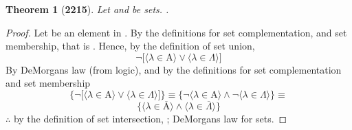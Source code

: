 \documentclass[preview]{standalone}
\newtheorem{theorem}{Theorem}
\begin{document}
\begin{theorem}[\textbf{2215}]
    Let  and \bm{$\Lambda$} be sets. 
    .
\end{theorem}
\begin{proof}
    Let \bm{$\lambda$} be an element in . 
    By the definitions for set complementation, and set membership, that is 
    . 
    Hence, by the definition of set union, 
    \begin{equation*}
        \lnot \bigg[
            \Big \langle \lambda \in \mathrm{A} \Big \rangle 
                \lor 
            \Big \langle \lambda \in \Lambda \Big \rangle
        \bigg]    
    \end{equation*}
    By DeMorgans law (from logic), 
    and by the definitions for set complementation
    and set membership
    \begin{equation*}
        \Bigg\{
            \lnot \bigg[
                \Big \langle \lambda \in \mathrm{A} \Big \rangle 
                    \lor 
                \Big \langle \lambda \in \Lambda \Big \rangle
            \bigg]
        \Bigg\}
        \equiv
        \Bigg\{
            \lnot \Big \langle \lambda \in \mathrm{A} \Big \rangle 
                \land 
            \lnot \Big \langle \lambda \in \Lambda \Big \rangle
        \Bigg\}
        \equiv
    \end{equation*}
    \begin{equation*}
        \Bigg\{
            \Big \langle \lambda \in \overline{\mathrm{A}} \Big \rangle 
                \land 
            \Big \langle \lambda \in \overline{\Lambda} \Big \rangle
        \Bigg\}
    \end{equation*}
    $\therefore$ by the definition of set intersection,
    ;
    DeMorgans law for sets.
\end{proof}
\end{document}
